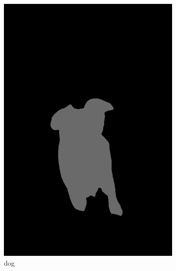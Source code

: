 \documentclass[11pt]{article}
\begin{document}
\begin{figure}[h]
     \centering
     \begin{subfigure}[b]{0.25\textwidth}
         \centering
         \includegraphics[width=\textwidth]{dog.png}
         \caption{dog}
         \label{fig:y equals x}
     \end{subfigure}
     \begin{subfigure}[b]{0.25\textwidth}
         \centering

\end{subfigure}
\end{figure}
\end{document}
